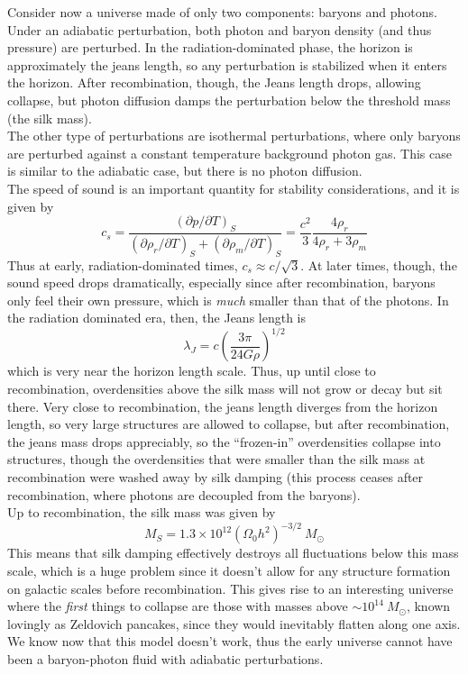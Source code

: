 \documentclass[10pt]{article}
\numberwithin{equation}{section}
\newcommand{\n}{\noindent}
\begin{document}
	\n Consider now a universe made of only two components: baryons and photons. Under an adiabatic perturbation, both photon and baryon density (and thus pressure) are perturbed. In the radiation-dominated phase, the horizon is approximately the jeans length, so any perturbation is stabilized when it enters the horizon. After recombination, though, the Jeans length drops, allowing collapse, but photon diffusion damps the perturbation below the threshold mass (the silk mass).\\
	
	\n The other type of perturbations are isothermal perturbations, where only baryons are perturbed against a constant temperature background photon gas. This case is similar to the adiabatic case, but there is no photon diffusion.\\
	
	\n The speed of sound is an important quantity for stability considerations, and it is given by
	\begin{equation}
		\label{eq:struc7} c_s = \frac{(\partial p/\partial T)_S}{(\partial \rho_r/\partial T)_S+(\partial \rho_m/\partial T)_S} = \frac{c^2}{3}\frac{4\rho_r}{4\rho_r+3\rho_m}
	\end{equation}
	Thus at early, radiation-dominated times, $c_s\approx c/\sqrt{3}$. At later times, though, the sound speed drops dramatically, especially since after recombination, baryons only feel their own pressure, which is \emph{much} smaller than that of the photons. In the radiation dominated era, then, the Jeans length is
	\begin{equation}
		\label{eq:struc8} \lambda_J = c\left(\frac{3\pi}{24G\rho}\right)^{1/2}
	\end{equation}
	which is very near the horizon length scale. Thus, up until close to recombination, overdensities above the silk mass will not grow or decay but sit there. Very close to recombination, the jeans length diverges from the horizon length, so very large structures are allowed to collapse, but after recombination, the jeans mass drops appreciably, so the ``frozen-in'' overdensities collapse into structures, though the overdensities that were smaller than the silk mass at recombination were washed away by silk damping (this process ceases after recombination, where photons are decoupled from the baryons).\\
	
	\n Up to recombination, the silk mass was given by
	\begin{equation}
		\label{eq:struc9} M_S = 1.3\times 10^{12}\left(\Omega_0h^2\right)^{-3/2}\ M_\odot
	\end{equation}
	This means that silk damping effectively destroys all fluctuations below this mass scale, which is a huge problem since it doesn't allow for any structure formation on galactic scales before recombination. This gives rise to an interesting universe where the \emph{first} things to collapse are those with masses above $\sim 10^{14}\ M_\odot$, known lovingly as Zeldovich pancakes, since they would inevitably flatten along one axis. We know now that this model doesn't work, thus the early universe cannot have been a baryon-photon fluid with adiabatic perturbations.\\
	
\end{document}
